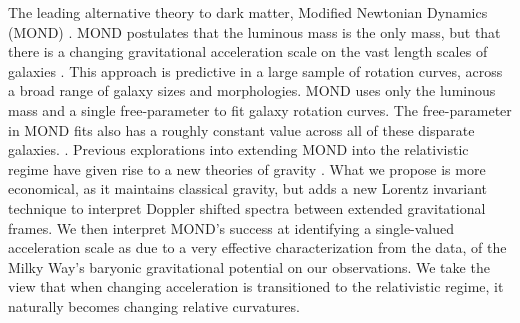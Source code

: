 \documentclass[reprint,%
 amsmath,amssymb,
 aps,
]{revtex4-1}
\begin{document}
  The leading   alternative theory  to dark matter,  Modified Newtonian Dynamics (MOND) \cite{Milgrom}.  MOND postulates that the luminous mass is the only mass, but   
  that there is  a changing gravitational acceleration scale on the vast length scales of galaxies \cite{McGaugh_2014}. 
  This approach  is   predictive in a large sample of  rotation curves,  across a broad   range  of galaxy sizes and morphologies. MOND uses only the  luminous mass and a single free-parameter to fit galaxy rotation curves. The free-parameter in  MOND fits also   has   a roughly constant value across all of these disparate galaxies.  \cite{McGaugh2016RAR,2022A&A...664A..40M}. 
  Previous explorations into  extending MOND into the relativistic regime have given rise to a new theories of gravity  \cite{PhysRevD.70.083509,doi:10.1142/S0217751X0703666X}.  What  we propose is more economical, as it maintains classical gravity, but adds a new Lorentz invariant technique to interpret Doppler shifted spectra between extended gravitational frames. We    then interpret   MOND's success at identifying a   single-valued acceleration scale  as due to a very effective characterization from the data,  of the Milky Way's baryonic gravitational potential on our observations. We take the view that when changing acceleration is transitioned to the relativistic regime, it naturally becomes changing relative curvatures.   
   
 
 
 
 
\end{document}
